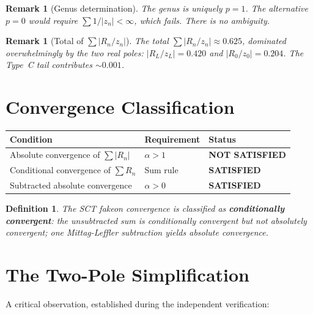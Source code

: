 \documentclass[11pt,a4paper]{article}
\newtheorem{remark}[theorem]{Remark}
\newtheorem{definition}[theorem]{Definition}
\begin{document}
\begin{remark}[Genus determination]
The genus is \emph{uniquely} $p = 1$.  The alternative $p = 0$ would
require $\sum 1/|z_n| < \infty$, which fails.  There is no ambiguity.
\end{remark}

\begin{remark}[Total of $\sum |R_n/z_n|$]
The total $\sum |R_n/z_n| \approx 0.625$, dominated overwhelmingly
by the two real poles: $|R_L/z_L| = 0.420$ and $|R_0/z_0| = 0.204$.
The Type~C tail contributes $\sim 0.001$.
\end{remark}


\section{Convergence Classification}
\label{sec:classification}

\begin{center}
\begin{tabular}{lll}
\toprule
Condition & Requirement & Status \\
\midrule
Absolute convergence of $\sum |R_n|$ & $\alpha > 1$ &
  \textbf{NOT SATISFIED} \\
Conditional convergence of $\sum R_n$ & Sum rule &
  \textbf{SATISFIED} \\
Subtracted absolute convergence & $\alpha > 0$ &
  \textbf{SATISFIED} \\
\bottomrule
\end{tabular}
\end{center}

\begin{definition}
The SCT fakeon convergence is classified as
\textbf{conditionally convergent}: the unsubtracted sum is
conditionally convergent but not absolutely convergent; one
Mittag-Leffler subtraction yields absolute convergence.
\end{definition}


\section{The Two-Pole Simplification}
\label{sec:twopole}

A critical observation, established during the independent verification:
\end{document}
